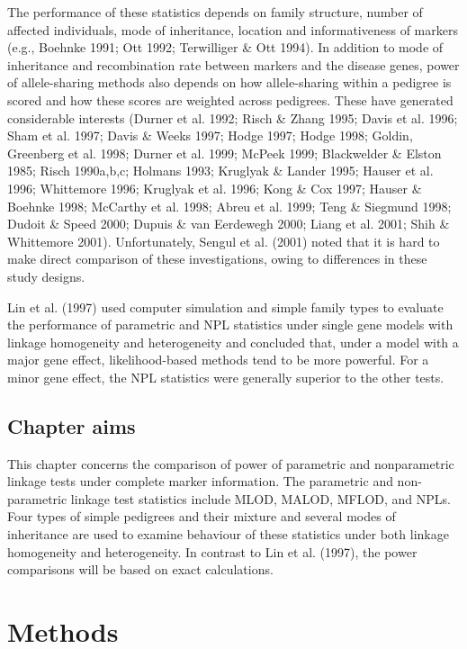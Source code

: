 The performance of these statistics depends on family structure, number of
affected individuals, mode of inheritance, location and informativeness of
markers (e.g., Boehnke 1991; Ott 1992; Terwilliger \& Ott 1994).  In addition
to mode of inheritance and recombination rate between markers and the disease
genes, power of allele-sharing methods also depends on how allele-sharing
within a pedigree is scored and how these scores are weighted across pedigrees.
These have generated considerable interests (Durner et al.  1992; Risch \&
Zhang 1995; Davis et al.  1996; Sham et al.  1997; Davis \& Weeks 1997; Hodge
1997; Hodge 1998; Goldin, Greenberg et al.  1998; Durner et al.  1999; McPeek
1999; Blackwelder \& Elston 1985; Risch 1990a,b,c; Holmans 1993; Kruglyak \&
Lander 1995; Hauser et al.  1996; Whittemore 1996; Kruglyak et al.  1996; Kong
\& Cox 1997; Hauser \& Boehnke 1998; McCarthy et al.  1998; Abreu et al.  1999;
Teng \& Siegmund 1998; Dudoit \& Speed 2000; Dupuis \& van Eerdewegh 2000;
Liang et al.  2001; Shih \& Whittemore 2001).  Unfortunately, Sengul et al.
(2001) noted that it is hard to make direct comparison of these investigations,
owing to differences in these study designs.

Lin et al.  (1997) used computer simulation and simple family types to evaluate
the performance of parametric and NPL statistics under single gene models with
linkage homogeneity and heterogeneity and concluded that, under a model with a
major gene effect, likelihood-based methods tend to be more powerful.  For a
minor gene effect, the NPL statistics were generally superior to the other
tests.

\subsection*{Chapter aims}

This chapter concerns the comparison of power of parametric and nonparametric
linkage tests under complete marker information.  The parametric and
non-parametric linkage test statistics include MLOD, MALOD, MFLOD, and NPLs.
Four types of simple pedigrees and their mixture and several modes of
inheritance are used to examine behaviour of these statistics under both
linkage homogeneity and heterogeneity.  In contrast to Lin et al.  (1997), the
power comparisons will be based on exact calculations.


\section{Methods}

